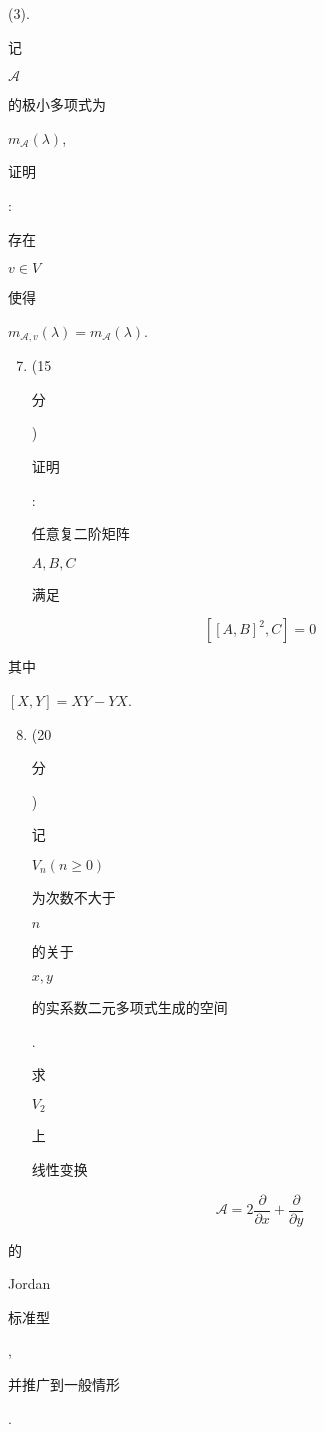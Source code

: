 \documentclass[10pt]{article}
\begin{document}
(3). \begin{CJK}{UTF8}{mj}记\end{CJK} $\mathscr{A}$ \begin{CJK}{UTF8}{mj}的极小多项式为\end{CJK} $m_{\mathscr{A}}(\lambda)$, \begin{CJK}{UTF8}{mj}证明\end{CJK}: \begin{CJK}{UTF8}{mj}存在\end{CJK} $v \in V$ \begin{CJK}{UTF8}{mj}使得\end{CJK} $m_{\mathscr{A}, v}(\lambda)=m_{\mathscr{A}}(\lambda)$.

\begin{enumerate}
  \setcounter{enumi}{6}
  \item (15 \begin{CJK}{UTF8}{mj}分\end{CJK}) \begin{CJK}{UTF8}{mj}证明\end{CJK}: \begin{CJK}{UTF8}{mj}任意复二阶矩阵\end{CJK} $A, B, C$ \begin{CJK}{UTF8}{mj}满足\end{CJK}
\end{enumerate}
$$
\left[[A, B]^{2}, C\right]=0
$$
\begin{CJK}{UTF8}{mj}其中\end{CJK} $[X, Y]=X Y-Y X$.

\begin{enumerate}
  \setcounter{enumi}{7}
  \item (20 \begin{CJK}{UTF8}{mj}分\end{CJK}) \begin{CJK}{UTF8}{mj}记\end{CJK} $V_{n}(n \geqslant 0)$ \begin{CJK}{UTF8}{mj}为次数不大于\end{CJK} $n$ \begin{CJK}{UTF8}{mj}的关于\end{CJK} $x, y$ \begin{CJK}{UTF8}{mj}的实系数二元多项式生成的空间\end{CJK}. \begin{CJK}{UTF8}{mj}求\end{CJK} $V_{2}$ \begin{CJK}{UTF8}{mj}上\end{CJK} \begin{CJK}{UTF8}{mj}线性变换\end{CJK}
\end{enumerate}
$$
\mathscr{A}=2 \frac{\partial}{\partial x}+\frac{\partial}{\partial y}
$$
\begin{CJK}{UTF8}{mj}的\end{CJK} Jordan \begin{CJK}{UTF8}{mj}标准型\end{CJK}, \begin{CJK}{UTF8}{mj}并推广到一般情形\end{CJK}.
\end{document}
